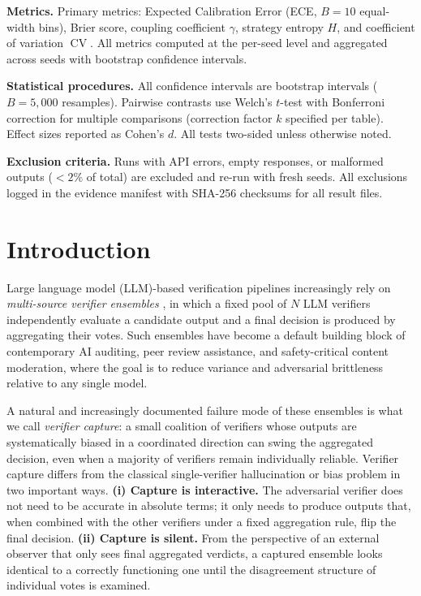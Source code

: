 \documentclass[11pt]{article}
\DeclareMathOperator{\CV}{CV}
\begin{document}
\textbf{Metrics.} Primary metrics: Expected Calibration Error (ECE, $B{=}10$ equal-width bins), Brier score, coupling coefficient $\gamma$, strategy entropy $H$, and coefficient of variation $\CV$. All metrics computed at the per-seed level and aggregated across seeds with bootstrap confidence intervals.

\textbf{Statistical procedures.} All confidence intervals are bootstrap intervals ($B{=}5{,}000$ resamples). Pairwise contrasts use Welch's $t$-test with Bonferroni correction for multiple comparisons (correction factor $k$ specified per table). Effect sizes reported as Cohen's $d$. All tests two-sided unless otherwise noted.

\textbf{Exclusion criteria.} Runs with API errors, empty responses, or malformed outputs ($<2\%$ of total) are excluded and re-run with fresh seeds. All exclusions logged in the evidence manifest with SHA-256 checksums for all result files.

\section{Introduction}
\label{sec:intro}

Large language model (LLM)-based verification pipelines increasingly rely on
\emph{multi-source verifier ensembles} \citep{cui2026edo,leung2026rubricllm}, in which a fixed pool
of $N$ LLM verifiers independently evaluate a candidate output and a final
decision is produced by aggregating their votes. Such ensembles have become a
default building block of contemporary AI auditing, peer review assistance,
and safety-critical content moderation, where the goal is to reduce variance
and adversarial brittleness relative to any single model.

A natural and increasingly documented failure mode of these ensembles is what
we call \emph{verifier capture}: a small coalition of verifiers whose outputs
are systematically biased in a coordinated direction can swing the aggregated
decision, even when a majority of verifiers remain individually reliable.
Verifier capture differs from the classical single-verifier hallucination or
bias problem in two important ways.
\textbf{(i) Capture is interactive.} The adversarial verifier does not need to
be accurate in absolute terms; it only needs to produce outputs that, when
combined with the other verifiers under a fixed aggregation rule, flip the
final decision.
\textbf{(ii) Capture is silent.} From the perspective of an external observer
that only sees final aggregated verdicts, a captured ensemble looks identical
to a correctly functioning one until the disagreement structure of individual
votes is examined.
\end{document}

